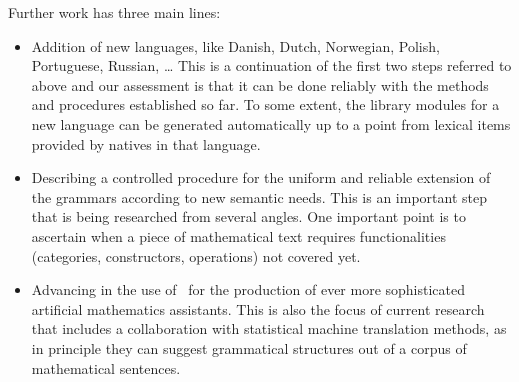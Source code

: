 \documentclass[adraft,copyright,creativecommons]{eptcs}
\begin{document}
Further work has three main lines:
\begin{itemize}
\item
Addition of new languages,
like Danish, Dutch, Norwegian, Polish, Portuguese, Russian, \ldots
This is a continuation of the first two steps referred to above and
our assessment is that it can be done reliably with the methods and
procedures established so far. To some extent, the library modules for a
new language can be generated automatically up to a point
from lexical items provided by natives in that language.
\item
Describing a controlled procedure for the uniform and reliable extension
of the grammars according to new semantic needs. This is an important step
that is being researched from several angles. One important point is to
ascertain when a piece of mathematical text requires functionalities
(categories, constructors, operations) not covered yet.
\item
Advancing in the use of \MGL\ for the production of ever more
sophisticated artificial mathematics assistants. This is also the focus of
current research that includes a collaboration with statistical machine
translation methods, as in principle they can suggest grammatical structures
out of a corpus of mathematical sentences.
\end{itemize}



\nocite{*}

%

\end{document}
